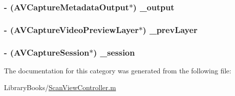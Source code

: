 \subsubsection[{\+\_\+output}]{\setlength{\rightskip}{0pt plus 5cm}-\/ (A\+V\+Capture\+Metadata\+Output$\ast$) \+\_\+output\hspace{0.3cm}{\ttfamily [protected]}}\label{category_scan_view_controller_07_08_a458e5f4f769b551dda293364db849e40}
\hypertarget{category_scan_view_controller_07_08_aae6661ab8758207b3b8a9b39ed9a5edd}{}
\subsubsection[{\+\_\+prev\+Layer}]{\setlength{\rightskip}{0pt plus 5cm}-\/ (A\+V\+Capture\+Video\+Preview\+Layer$\ast$) \+\_\+prev\+Layer\hspace{0.3cm}{\ttfamily [protected]}}\label{category_scan_view_controller_07_08_aae6661ab8758207b3b8a9b39ed9a5edd}
\hypertarget{category_scan_view_controller_07_08_aaa4b54d43d608a14daff099ca2b5e890}{}
\subsubsection[{\+\_\+session}]{\setlength{\rightskip}{0pt plus 5cm}-\/ (A\+V\+Capture\+Session$\ast$) \+\_\+session\hspace{0.3cm}{\ttfamily [protected]}}\label{category_scan_view_controller_07_08_aaa4b54d43d608a14daff099ca2b5e890}


The documentation for this category was generated from the following file\+:\begin{DoxyCompactItemize}
\item 
Library\+Books/\hyperlink{_scan_view_controller_8m}{Scan\+View\+Controller.\+m}\end{DoxyCompactItemize}
